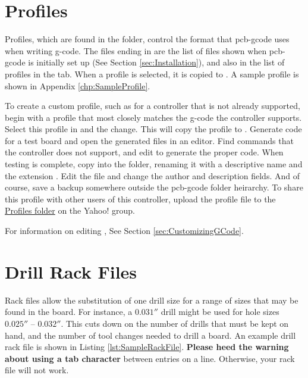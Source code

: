 \documentclass[11pt]{book}
\begin{document}
%
%
\section{Profiles}\label{sec:Profiles}

Profiles, which are found in the  folder, control the format that pcb-gcode uses when writing g-code. The files ending in  are the list of files shown when pcb-gcode is initially set up (See Section \vref{sec:Installation}), and also in the list of profiles in the  tab. When a profile is selected, it is copied to . A sample profile is shown in Appendix \vref{chp:SampleProfile}. 

To create a custom profile, such as for a controller that is not already supported, begin with a profile that most closely matches the g-code the controller supports. Select this profile in  and  the change. This will copy the profile to . Generate code for a test board and open the generated files in an editor. Find commands that the controller does not support, and edit  to generate the proper code. When testing is complete, copy  into the  folder, renaming it with a descriptive name and the extension . Edit the file and change the author and description fields. And of course, save a backup somewhere outside the pcb-gcode folder heirarchy. To share this profile with other users of this controller, upload the profile file to the \href{http://groups.yahoo.com/group/pcb-gcode/files/%21%20Software/Profiles/}{Profiles folder} on the Yahoo! group.

For information on editing , See Section \vref{sec:CustomizingGCode}.


%
%
\section{Drill Rack Files}\label{sec:DrillRackFiles}

Rack files allow the substitution of one drill size for a range of sizes that may be found in the board. For instance, a $0.031''$ drill might be used for hole sizes $0.025''$ -- $0.032''$. This cuts down on the number of drills that must be kept on hand, and the number of tool changes needed to drill a board. An example drill rack file is shown in Listing \ref{lst:SampleRackFile}. \textbf{Please heed the warning about using a tab character} between entries on a line. Otherwise, your rack file will not work.
\end{document}
